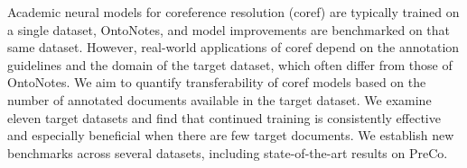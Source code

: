Academic neural models for coreference resolution (coref) are typically trained on a single dataset, OntoNotes, and model improvements are benchmarked on that same dataset. However, real-world applications of coref depend on the annotation guidelines and the domain of the target dataset, which often differ from those of OntoNotes. We aim to quantify transferability of coref models based on the number of annotated documents available in the target dataset. We examine eleven target datasets and find that continued training is consistently effective and especially beneficial when there are few target documents. We establish new benchmarks across several datasets, including state-of-the-art results on PreCo.
